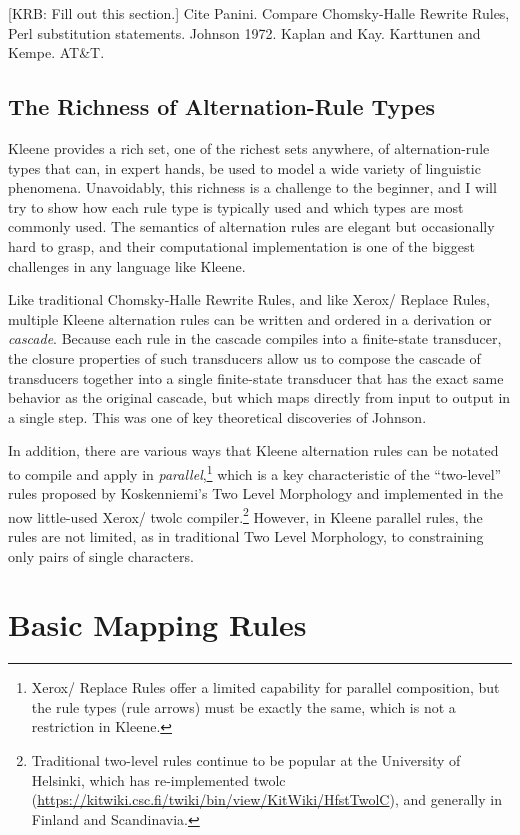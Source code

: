 [KRB:  Fill out this section.]  Cite Panini.  Compare Chomsky-Halle Rewrite Rules, Perl substitution statements.
Johnson 1972.  Kaplan and Kay.  Karttunen and Kempe.  AT\&T.


\subsection{The Richness of Alternation-Rule Types}

Kleene provides a rich set, one of the richest sets anywhere, of alternation-rule types
that can, in expert hands, be used to model a wide variety of linguistic phenomena.
Unavoidably, this richness is a challenge to the beginner, and I will try to show how
each rule type is typically used and which types are most commonly used.  The semantics
of alternation rules are elegant but occasionally hard to grasp, and their computational
implementation is one of the biggest challenges in any language like Kleene.

Like traditional Chomsky-Halle Rewrite Rules, and like Xerox/ Replace Rules,
multiple Kleene alternation rules can be written and ordered in a derivation or
\emph{cascade}.  Because each rule in the cascade compiles into a finite-state transducer,
the closure properties of such transducers allow us to compose the cascade of transducers
together into a single finite-state transducer that has the exact same behavior as the
original cascade, but which maps directly from input to output in a single step.  This
was one of key theoretical discoveries of Johnson.

In addition, there are various ways that Kleene alternation rules can be notated to compile
and apply in \emph{parallel},\footnote{Xerox/ Replace Rules offer a limited
capability for parallel composition, but the rule types (rule arrows) must be exactly the
same, which is not a restriction in Kleene.}  which is a key characteristic of the
``two-level'' rules proposed by Koskenniemi's Two Level Morphology and implemented in the
now little-used Xerox/ twolc compiler.\footnote{Traditional two-level rules
	continue to be popular at the University of Helsinki, which has re-implemented twolc
(\url{https://kitwiki.csc.fi/twiki/bin/view/KitWiki/HfstTwolC}), and generally in Finland
and Scandinavia.}  However, in Kleene parallel rules, the rules are not limited, as in
traditional Two Level Morphology, to constraining only pairs of single characters.

\section{Basic Mapping Rules}


